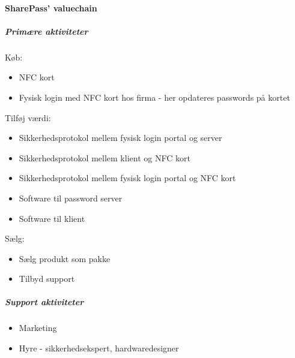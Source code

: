 \paragraph{SharePass' valuechain}
\subparagraph*{Primære aktiviteter}
\subparagraph*{} 
Køb:
\begin{itemize}
\item NFC kort
\item Fysisk login med NFC kort hos firma - her opdateres passwords på kortet
\end{itemize}
Tilføj værdi:
\begin{itemize}
\item Sikkerhedsprotokol mellem fysisk login portal og server
\item Sikkerhedsprotokol mellem klient og NFC kort
\item Sikkerhedsprotokol mellem fysisk login portal og NFC kort
\item Software til password server
\item Software til klient
\end{itemize}
Sælg:
\begin{itemize}
\item Sælg produkt som pakke
\item Tilbyd support
\end{itemize}

\subparagraph*{Support aktiviteter}
\begin{itemize}
\item Marketing
\item Hyre - sikkerhedsekspert, hardwaredesigner
\end{itemize}